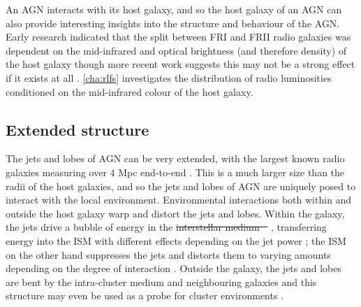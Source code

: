 \documentclass[11pt, a4paper]{book}
\providecommand{\DIFaddtex}[1]{{\protect\color{blue}\uwave{#1}}} %
\providecommand{\DIFdeltex}[1]{{\protect\color{red}\sout{#1}}}                      %
\providecommand{\DIFaddbegin}{} %
\providecommand{\DIFaddend}{} %
\providecommand{\DIFdelbegin}{} %
\providecommand{\DIFdelend}{} %
\providecommand{\DIFadd}[1]{\texorpdfstring{\DIFaddtex{#1}}{#1}} %
\providecommand{\DIFdel}[1]{\texorpdfstring{\DIFdeltex{#1}}{}} %
\newcommand{\DIFscaledelfig}{0.5}
\newlength{\DIFdelgraphicswidth} %
\newlength{\DIFdelgraphicsheight} %
\newcommand{\DIFaddincludegraphics}[2][]{{\color{blue}\fbox{\DIFOincludegraphics[#1]{#2}}}} %
\newcommand{\DIFdelincludegraphics}[2][]{%
\sbox{\DIFdelgraphicsbox}{\DIFOincludegraphics[#1]{#2}}%
\settoboxwidth{\DIFdelgraphicswidth}{\DIFdelgraphicsbox} %
\settoboxtotalheight{\DIFdelgraphicsheight}{\DIFdelgraphicsbox} %
\scalebox{\DIFscaledelfig}{%
\parbox[b]{\DIFdelgraphicswidth}{\usebox{\DIFdelgraphicsbox}\\[-\baselineskip] \rule{\DIFdelgraphicswidth}{0em}}\llap{\resizebox{\DIFdelgraphicswidth}{\DIFdelgraphicsheight}{%
\setlength{\unitlength}{\DIFdelgraphicswidth}%
\begin{picture}(1,1)%
\thicklines\linethickness{2pt} %
{\color[rgb]{1,0,0}\put(0,0){\framebox(1,1){}}}%
{\color[rgb]{1,0,0}\put(0,0){\line( 1,1){1}}}%
{\color[rgb]{1,0,0}\put(0,1){\line(1,-1){1}}}%
\end{picture}%
}\hspace*{3pt}}} %
} %
\DeclareRobustCommand{\DIFaddbegin}{\DIFOaddbegin \let\includegraphics\DIFaddincludegraphics} %
\DeclareRobustCommand{\DIFaddend}{\DIFOaddend \let\includegraphics\DIFOincludegraphics} %
\DeclareRobustCommand{\DIFdelbegin}{\DIFOdelbegin \let\includegraphics\DIFdelincludegraphics} %
\DeclareRobustCommand{\DIFdelend}{\DIFOaddend \let\includegraphics\DIFOincludegraphics} %
\begin{document}
        An AGN interacts with its host galaxy, and so the host galaxy of an AGN can also provide interesting insights into the structure and behaviour of the AGN. Early research indicated that the split between FRI and FRII radio galaxies was dependent on the mid-infrared and optical brightness (and therefore density) of the host galaxy \citep{ledlow_20_1996,bicknell_relativistic_1995} though more recent work suggests this may not be a strong effect if it exists at all \citep{hardcastle20feedback}. \autoref{cha:rlfs} investigates the distribution of radio luminosities conditioned on the mid-infrared colour of the host galaxy.

    \subsection{Extended structure}
    \label{sec:extended-structure-of-agn}

        The jets and lobes of AGN can be very extended, with the largest known radio galaxies measuring over 4 Mpc end-to-end \citep{machalski_understanding_2011}. This is a much larger size than the radii of the host galaxies, and so the jets and lobes of AGN are uniquely posed to interact with the local environment. Environmental interactions both within and outside the host galaxy warp and distort the jets and lobes. Within the galaxy, the jets drive a bubble of energy in the \DIFdelbegin \DIFdel{interstellar medium \mbox{%
\citep[ISM;][]{mukherjee_relativistic_2016}}\hspace{0pt}%
}\DIFdelend \DIFaddbegin \DIFadd{ISM \mbox{%
\citep{mukherjee_relativistic_2016}}\hspace{0pt}%
}\DIFaddend , transferring energy into the ISM with different effects depending on the jet power \citep{mukherjee_relativistic_2018}; the ISM on the other hand suppresses the jets and distorts them to varying amounts depending on the degree of interaction \citep{mukherjee_relativistic_2018}. Outside the galaxy, the jets and lobes are bent by the intra-cluster medium and neighbouring galaxies \citep[ICM;][]{garon19bending,rodman19asymmetry} and this structure may even be used as a probe for cluster environments \citep{banfield_radio_2016,sakelliou_3c40_2008}.
\end{document}
